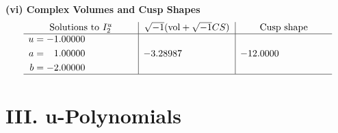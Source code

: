 \documentclass[1p]{elsarticle_modified}
\theoremstyle{definition}
\newcommand{\I}{\sqrt{-1}}
\begin{document}
\newpage\flushleft \textbf{(vi) Complex Volumes and Cusp Shapes}
$$\begin{array}{c|c|c}  
\text{Solutions to }I^u_{2}& \I (\text{vol} + \sqrt{-1}CS) & \text{Cusp shape}\\
 \hline 
\begin{aligned}
u &= -1.00000\phantom{ +0.000000I} \\
a &= \phantom{-}1.00000\phantom{ +0.000000I} \\
b &= -2.00000\phantom{ +0.000000I}\end{aligned}
 & -3.28987\phantom{ +0.000000I} & -12.0000\phantom{ +0.000000I}\\
 \hline 
 \end{array}$$\newpage
\newpage\renewcommand{\arraystretch}{1}
\centering \section*{ III. u-Polynomials}
\end{document}
